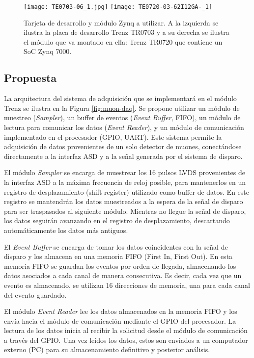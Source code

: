 		\begin{figure}[H]
			\centering
			\texttt{[image: TE0703-06\_1.jpg]}
			\texttt{[image: TE0720-03-62I12GA-\_1]}
			\caption{Tarjeta de desarrollo y módulo Zynq a utilizar. A la izquierda se ilustra la placa de desarrollo Trenz TR0703\cite{TrenzElectronic2019TE0703Wiki} y a su derecha se ilustra el módulo que va montado en ella: Trenz TR0720\cite{TrenzElectronic2020TE0720Wiki} que contiene un SoC Zynq 7000\cite{}.}
			\label{fig:trenz}
		\end{figure}
	
	\subsection{Propuesta}
		La arquitectura del sistema de adquisición que se implementará en el módulo Trenz se ilustra en la Figura \ref{fig:muon-daq}. Se propone utilizar un módulo de muestreo (\textit{Sampler}), un buffer de eventos (\textit{Event Buffer}, FIFO), un módulo de lectura para comunicar los datos (\textit{Event Reader}), y un módulo de comunicación implementado en el procesador (GPIO, UART). Este sistema permite la adquisición de datos provenientes de un solo detector de muones, conectándose directamente a la interfaz ASD y a la señal generada por el sistema de disparo.
		
		El módulo \textit{Sampler} se encarga de muestrear los 16 pulsos LVDS provenientes de la interfaz ASD a la máxima frecuencia de reloj posible, para mantenerlos en un registro de desplazamiento (shift register) utilizado como buffer de datos. En este registro se mantendrán los datos muestreados a la espera de la señal de disparo para ser traspasados al siguiente módulo. Mientras no llegue la señal de disparo, los datos seguirán avanzando en el registro de desplazamiento, descartando automáticamente los datos más antiguos.
		
		El \textit{Event Buffer} se encarga de tomar los datos coincidentes con la señal de disparo y los almacena en una memoria FIFO (First In, First Out)\cite{XilinxFIFOSuite}. En esta memoria FIFO se guardan los eventos por orden de llegada, almacenando los datos asociados a cada canal de manera consecutiva. Es decir, cada vez que un evento es almacenado, se utilizan 16 direcciones de memoria, una para cada canal del evento guardado.
		
		El módulo \textit{Event Reader} lee los datos almacenados en la memoria FIFO y los envía hacia el módulo de comunicación mediante el GPIO del procesador. La lectura de los datos inicia al recibir la solicitud desde el módulo de comunicación a través del GPIO. Una vez leídos los datos, estos son enviados a un computador externo (PC) para su almacenamiento definitivo y posterior análisis.
		
